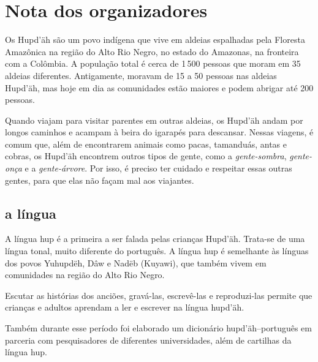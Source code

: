 \chapter{Nota dos organizadores}

Os Hupd’äh são um povo indígena que vive em aldeias espalhadas pela Floresta Amazônica na região do Alto Rio Negro, no estado do Amazonas, na fronteira com a Colômbia. A população total é cerca de 1\,500 pessoas que moram em 35 aldeias diferentes. Antigamente, moravam de 15 a 50 pessoas nas aldeias Hupd’äh, mas hoje em dia as comunidades estão maiores e podem abrigar até 200 pessoas.


Quando viajam para visitar parentes em outras aldeias, os Hupd’äh andam por longos caminhos e acampam à beira do igarapés para descansar. Nessas viagens, é comum que, além de encontrarem animais como pacas, tamanduás, antas e cobras, os Hupd’äh encontrem outros tipos de gente, como a \textit{gente-sombra}, \textit{gente-onça} e a \textit{gente-árvore}. Por isso, é preciso ter cuidado e respeitar essas outras gentes, para que elas não façam mal aos viajantes.

\section{a língua}

A língua hup é a primeira a ser falada pelas crianças Hupd’äh. Trata-se de uma língua tonal, muito
diferente do português. A língua hup é semelhante às línguas dos povos Yuhupdëh,
Dâw e Nadëb (Kuyawi), que também vivem em comunidades na região do Alto Rio Negro.


Escutar as histórias dos anciões, gravá-las, escrevê-las e reproduzi-las permite que
crianças e adultos aprendam a ler e escrever na língua hupd’äh.

Também durante esse período foi elaborado um dicionário hupd’äh--português em parceria
com pesquisadores de diferentes universidades, além de cartilhas da língua hup.